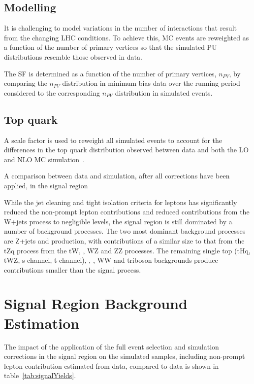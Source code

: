 \subsection{\PU Modelling}\label{subsec:puSF}
It is challenging to model variations in the number of \PU interactions that result from the changing LHC conditions.
To achieve this, MC events are reweighted as a function of the number of primary vertices so that the simulated PU distributions resemble those observed in data.

The \PU SF is determined as a function of the number of primary vertices, $n_{PV}$, by comparing the $n_{PV}$ distribution in minimum bias data over the running period considered to the corresponding $n_{PV}$ distribution in simulated events.

\subsection{Top quark \pt}
A scale factor is used to reweight all simulated \ttbar events to account for the differences in the top quark \pt distribution observed between data and both the LO and NLO MC simulation~\cite{Khachatryan:2015oqa}.

A comparison between data and simulation, after all corrections have been applied, in the signal region 

While the jet cleaning and tight isolation criteria for leptons has significantly reduced the non-prompt lepton contributions and reduced contributions from the W+jets process to negligible levels, the signal region is still dominated by a number of background processes.
The two most dominant background processes are Z+jets and \ttbar production, with contributions of a similar size to that from the tZq process from the tW, \ttbarZ, WZ and ZZ processes.
The remaining single top (tHq, tWZ, s-channel, t-channel), \ttbarW, \ttbarH, WW and triboson backgrounds produce contributions smaller than the signal process.

\section{Signal Region Background Estimation}\label{sec:simBackgrounds}
The impact of the application of the full event selection and simulation corrections in the signal region on the simulated samples, including non-prompt lepton contribution estimated from data, compared to data is shown in table~\ref{tab:signalYields}.

